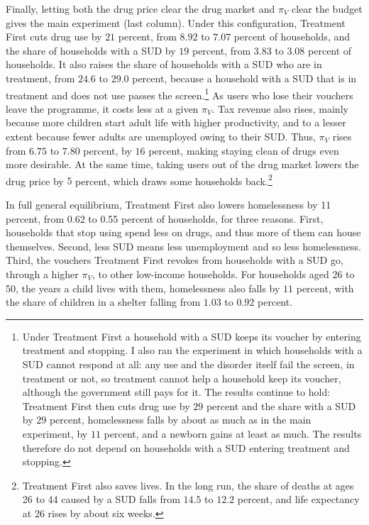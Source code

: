 \documentclass[10pt]{article}
\begin{document}
Finally, letting both the drug price clear the drug market and $\pi_V$ clear the budget gives the main experiment (last column). Under this configuration, Treatment First cuts drug use by $21$ percent,
from $8.92$ to $7.07$ percent of households, and the share of households with
a SUD by $19$ percent, from $3.83$ to $3.08$ percent of
households. It also raises the share of households with a SUD who are in treatment, from $24.6$ to $29.0$ percent, because a household with a SUD that is in treatment and does not use passes the screen.\footnote{Under Treatment First a household with a SUD keeps its voucher by entering treatment and stopping. I also ran the experiment in which households with a SUD cannot respond at all: any use and the disorder itself fail the screen, in treatment or not, so treatment cannot help a household keep its voucher, although the government still pays for it. The results continue to hold: Treatment First then cuts drug use by $29$ percent and the share with a SUD by $29$ percent, homelessness falls by about as much as in the main experiment, by $11$ percent, and a newborn gains at least as much. The results therefore do not depend on households with a SUD entering treatment and stopping.} As users who lose their vouchers leave the programme, it costs
less at a given $\pi_V$. Tax revenue also rises, mainly because more children start adult life with higher productivity, and to a lesser extent because fewer adults are unemployed owing to their SUD. Thus, $\pi_V$ rises from $6.75$ to
$7.80$ percent, by $16$ percent, making staying clean of drugs even more desirable. At the same time, taking users out of the drug market lowers the drug price by
$5$ percent, which draws some households back.\footnote{Treatment First also saves lives. In the long run, the share of deaths at ages 26 to 44 caused by a SUD falls from $14.5$ to $12.2$ percent, and life expectancy at 26 rises by about six weeks.} 

In full general equilibrium, Treatment First also lowers homelessness by 11 percent, from 0.62 to 0.55 percent of households, for three reasons. First, households that stop using spend less on drugs, and thus more of them can house themselves. Second, less SUD means less unemployment and so less homelessness. Third, the vouchers Treatment First revokes from households with a SUD go, through a higher $\pi_V$, to other low-income households. For households aged 26 to 50, the years a child lives with them, homelessness also falls by $11$ percent, with the share of children in a shelter falling from $1.03$ to $0.92$ percent.
\end{document}
